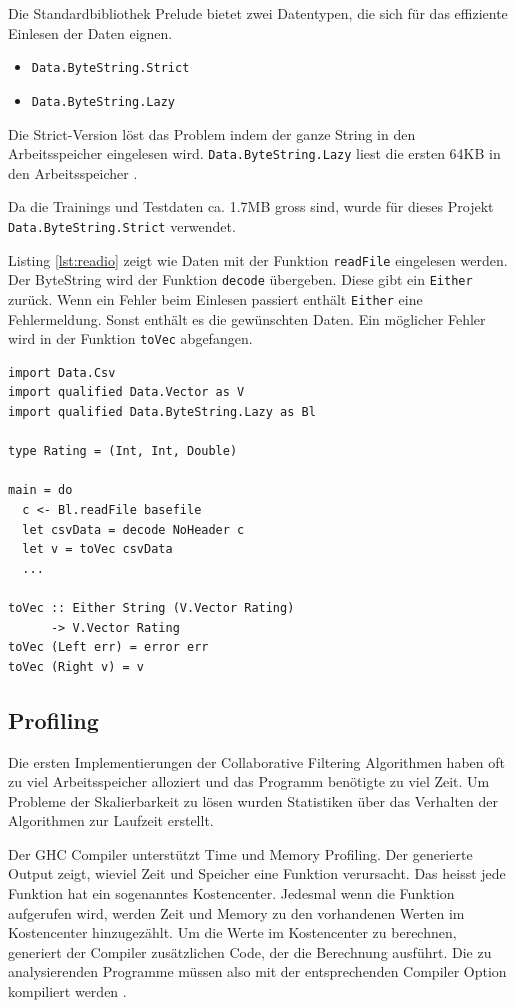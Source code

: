 \documentclass[a4paper, 12pt]{article}
\begin{document}
Die Standardbibliothek Prelude bietet zwei Datentypen, die sich für das effiziente Einlesen der Daten eignen.

\begin{itemize}
\item \verb|Data.ByteString.Strict|
\item \verb|Data.ByteString.Lazy|
\end{itemize}

 Die Strict-Version löst das Problem indem der ganze String in den Arbeitsspeicher eingelesen wird. \verb|Data.ByteString.Lazy| liest die ersten 64KB in den Arbeitsspeicher \cite{Lipovaca}.

Da die Trainings und Testdaten ca. 1.7MB gross sind, wurde für dieses Projekt \verb|Data.ByteString.Strict| verwendet.

Listing \ref{lst:readio} zeigt wie Daten mit der Funktion \verb|readFile| eingelesen werden. Der ByteString wird der Funktion \verb|decode| übergeben. Diese gibt ein \verb|Either| zurück. Wenn ein Fehler beim Einlesen passiert enthält \verb|Either| eine Fehlermeldung. Sonst enthält es die gewünschten Daten. Ein möglicher Fehler wird in der Funktion \verb|toVec| abgefangen.

\begin{lstlisting}[label={lst:readio},caption={Einlesen von Files mit ByteString}]
import Data.Csv
import qualified Data.Vector as V
import qualified Data.ByteString.Lazy as Bl

type Rating = (Int, Int, Double)

main = do
  c <- Bl.readFile basefile
  let csvData = decode NoHeader c
  let v = toVec csvData
  ...

toVec :: Either String (V.Vector Rating)
      -> V.Vector Rating
toVec (Left err) = error err
toVec (Right v) = v
\end{lstlisting}

\subsection{Profiling}
\label{sec:profiling}

Die ersten Implementierungen der Collaborative Filtering Algorithmen haben oft zu viel Arbeitsspeicher alloziert und das Programm benötigte zu viel Zeit. Um Probleme der Skalierbarkeit zu lösen wurden Statistiken über das Verhalten der Algorithmen zur Laufzeit erstellt.

Der GHC Compiler unterstützt Time und Memory Profiling. Der generierte Output zeigt, wieviel Zeit und Speicher eine Funktion verursacht. Das heisst jede Funktion hat ein sogenanntes Kostencenter. Jedesmal wenn die Funktion aufgerufen wird, werden Zeit und Memory zu den vorhandenen Werten im Kostencenter hinzugezählt. Um die Werte im Kostencenter zu berechnen, generiert der Compiler zusätzlichen Code, der die Berechnung ausführt. Die zu analysierenden Programme müssen also mit der entsprechenden Compiler Option kompiliert werden \cite{Mena}.
\end{document}

